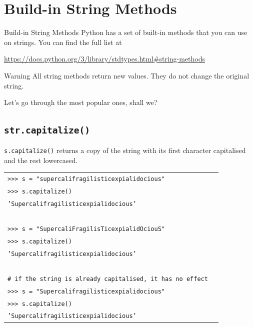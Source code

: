 \documentclass[t,handout,9pt]{beamer}
\begin{document}
\section{Build-in String Methods}
\begin{frame}{Build-in String Methods}
\vfill
Python has a set of built-in methods that you can use on strings.
\vfill
You can find the full list at
\begin{center}
\url{https://docs.python.org/3/library/stdtypes.html\#string-methods}
\end{center}
\vfill
\begin{block}{Warning}
All string methods return new values. They do not change the original string.
\end{block}
\vfill
Let's go through the most popular ones, shall we?
\vfill
\end{frame}
%
\subsection{\texttt{str.capitalize()}}
\begin{frame}
\texttt{s.capitalize()} returns a copy of the string with its first character capitalised and the rest lowercased.
\vfill
\begin{table}[]
\begin{flushleft}
\begin{tabular}{ll}
\texttt{>{}>{}> s = "supercalifragilisticexpialidocious"} &  \\
\texttt{>{}>{}> s.capitalize()} &  \\
\texttt{'Supercalifragilisticexpialidocious'} &  \\
\texttt{ } &  \\
\texttt{>{}>{}> s = "SupercaliFragilisTicexpialidOciouS"} &  \\
\texttt{>{}>{}> s.capitalize()} &  \\
\texttt{'Supercalifragilisticexpialidocious'} &  \\
\texttt{ } &  \\
\texttt{\# if the string is already capitalised, it has no effect} &  \\
\texttt{>{}>{}> s = "Supercalifragilisticexpialidocious"} &  \\
\texttt{>{}>{}> s.capitalize()} &  \\
\texttt{'Supercalifragilisticexpialidocious'} &  \\
\end{tabular}
\end{flushleft}
\end{table}
\vfill
\end{frame}
%
\end{document}
